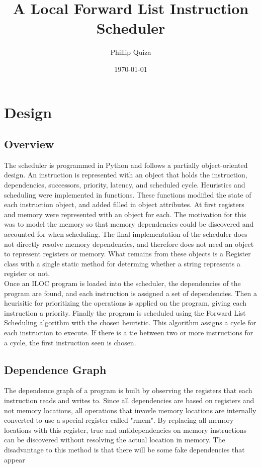 \documentclass{article}
\title{A Local Forward List Instruction Scheduler}
\date{\today}
\author{Phillip Quiza}
\begin{document}
\maketitle

\section{Design}
\subsection{Overview}
The scheduler is programmed in Python and follows a partially object-oriented design. An instruction is represented with an object that holds the instruction, dependencies, successors, priority, latency, and scheduled cycle. Heuristics and scheduling were implemented in functions. These functions modified the state of each instruction object, and added filled in object attributes. At first registers and memory were represented with an object for each. The motivation for this was to model the memory so that memory dependencies could be discovered and accounted for when scheduling. The final implementation of the scheduler does not directly resolve memory dependencies, and therefore does not need an object to represent registers or memory. What remains from these objects is a Register class with a single static method for determing whether a string represents a register or not.\\

Once an ILOC program is loaded into the scheduler, the dependencies of the program are found, and each instruction is assigned a set of dependencies. Then a heurisitic for prioritizing the operations is applied on the program, giving each instruction a priority. Finally the program is scheduled using the Forward List Scheduling algorithm with the chosen heuristic. This algorithm assigns a cycle for each instruction to execute. If there is a tie between two or more instructions for a cycle, the first instruction seen is chosen. 
\subsection{Dependence Graph}
The dependence graph of a program is built by observing the registers that each instruction reads and writes to. Since all dependencies are based on registers and not memory locations, all operations that invovle memory locations are internally converted to use a special register called "rmem". By replacing all memory locations with this register, true and antidependencies on memory instructions can be discovered without resolving the actual location in memory. The disadvantage to this method is that there will be some fake dependencies that appear 
\end{document}
